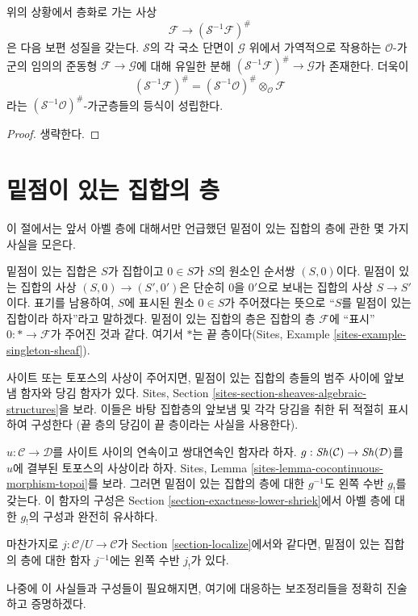 \begin{lemma}
\label{lemma-simple-invert-module}
위의 상황에서 층화로 가는 사상
$$
\mathcal{F} \longrightarrow (\mathcal{S}^{-1}\mathcal{F})^\#
$$
은 다음 보편 성질을 갖는다. $\mathcal{S}$의 각 국소 단면이
$\mathcal{G}$ 위에서 가역적으로 작용하는 $\mathcal{O}$-가군의
임의의 준동형 $\mathcal{F} \to \mathcal{G}$에 대해 유일한 분해
$(\mathcal{S}^{-1}\mathcal{F})^\# \to \mathcal{G}$가 존재한다.
더욱이
$$
(\mathcal{S}^{-1}\mathcal{F})^\#
=
(\mathcal{S}^{-1}\mathcal{O})^\# \otimes_\mathcal{O} \mathcal{F}
$$
라는 $(\mathcal{S}^{-1}\mathcal{O})^\#$-가군층들의 등식이 성립한다.
\end{lemma}

\begin{proof}
생략한다.
\end{proof}









\section{밑점이 있는 집합의 층}
\label{section-pointed}

\noindent
이 절에서는 앞서 아벨 층에 대해서만 언급했던 밑점이 있는 집합의 층에
관한 몇 가지 사실을 모은다.

\medskip\noindent
밑점이 있는 집합은 $S$가 집합이고 $0 \in S$가 $S$의 원소인 순서쌍
$(S, 0)$이다. 밑점이 있는 집합의 사상 $(S, 0) \to (S', 0')$은 단순히
$0$을 $0'$으로 보내는 집합의 사상 $S \to S'$이다. 표기를 남용하여,
$S$에 표시된 원소 $0 \in S$가 주어졌다는 뜻으로 ``$S$를 밑점이 있는
집합이라 하자''라고 말하겠다. 밑점이 있는 집합의 층은 집합의 층
$\mathcal{F}$에 ``표시'' $0 : * \to \mathcal{F}$가 주어진 것과 같다.
여기서 $*$는 끝 층이다(Sites, Example
\ref{sites-example-singleton-sheaf}).

\medskip\noindent
사이트 또는 토포스의 사상이 주어지면, 밑점이 있는 집합의 층들의 범주
사이에 앞보냄 함자와 당김 함자가 있다. Sites, Section
\ref{sites-section-sheaves-algebraic-structures}을 보라. 이들은 바탕
집합층의 앞보냄 및 각각 당김을 취한 뒤 적절히 표시하여 구성한다
(끝 층의 당김이 끝 층이라는 사실을 사용한다).

\medskip\noindent
$u : \mathcal{C} \to \mathcal{D}$를 사이트 사이의 연속이고 쌍대연속인
함자라 하자. $g : \mathop{\mathit{Sh}}\nolimits(\mathcal{C}) \to \mathop{\mathit{Sh}}\nolimits(\mathcal{D})$를 $u$에
결부된 토포스의 사상이라 하자. Sites, Lemma
\ref{sites-lemma-cocontinuous-morphism-topoi}를 보라. 그러면 밑점이 있는
집합의 층에 대한 $g^{-1}$도 왼쪽 수반 $g_!$를 갖는다. 이 함자의
구성은 Section \ref{section-exactness-lower-shriek}에서 아벨 층에 대한
$g_!$의 구성과 완전히 유사하다.

\medskip\noindent
마찬가지로 $j : \mathcal{C}/U \to \mathcal{C}$가 Section
\ref{section-localize}에서와 같다면, 밑점이 있는 집합의 층에 대한
함자 $j^{-1}$에는 왼쪽 수반 $j_!$가 있다.

\medskip\noindent
나중에 이 사실들과 구성들이 필요해지면, 여기에 대응하는 보조정리들을
정확히 진술하고 증명하겠다.












